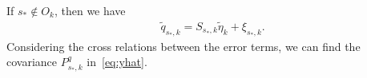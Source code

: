 \documentclass[letterpaper, 10 pt, conference]{ieeeconf}
\begin{document}
If $s_* \notin O_k$, then we have
\begin{align*}    &\tilde{q}_{s_*,k}=S_{s_*,k}\tilde{\eta}_k+\xi_{s_*,k}.
\end{align*}
Considering the cross relations between the error terms, we can find the covariance $P_{s_*,k}^q$ in~\eqref{eq:yhat}.
\end{document}

